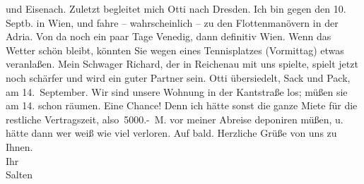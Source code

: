 \begin{ledgroupsized}[t]{13cm}
               und Eisenach. Zuletzt begleitet mich Otti nach Dresden. Ich bin gegen den 10. Septb. in Wien, und fahre – wahrscheinlich – zu den
               Flottenmanövern in der Adria. Von da noch ein
               paar Tage Venedig, dann definitiv Wien. Wenn das Wetter schön bleibt, könnten Sie
               wegen eines Tennisplatzes (Vormittag) etwas veranlaßen. Mein Schwager Richard, der in Reichenau mit uns spielte, spielt jetzt noch schärfer und wird ein guter
               Partner sein. Otti übersiedelt, Sack und Pack,
               am 14. September. Wir sind unsere Wohnung in der Kantstraße los; müßen sie am 14. schon räumen. Eine Chance! Denn ich hätte sonst die
               ganze Miete für die restliche Vertragszeit, also 5000.- M. vor meiner Abreise
               deponiren müßen, u. hätte dann wer weiß wie viel verloren. Auf bald. Herzliche Grüße
               von uns zu Ihnen. {\\}Ihr {\\}\spacefill\mbox{Salten}\pend
           
         
         \endnumbering{}\end{ledgroupsized}  \newcommand{\dateiname}{L03433}\newcommand{\titel}{Felix Salten an Arthur Schnitzler, 23. 8. 1906}\newcommand{\editorInnen}{Martin Anton Müller und Laura Untner}
      